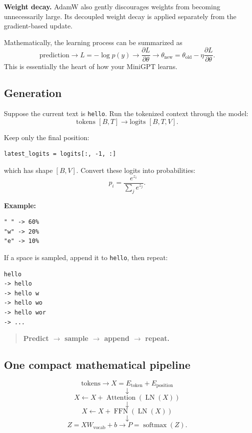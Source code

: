 \textbf{Weight decay.} AdamW also gently discourages weights from becoming
unnecessarily large. Its decoupled weight decay is applied separately from
the gradient-based update.

Mathematically, the learning process can be summarized as
\[
  \text{prediction}
  \longrightarrow
  L=-\log p(y)
  \longrightarrow
  \frac{\partial L}{\partial\theta}
  \longrightarrow
  \theta_{\text{new}}
  =\theta_{\text{old}}
  -\eta\frac{\partial L}{\partial\theta}.
\]
This is essentially the heart of how your MiniGPT learns.



\subsection{Generation}

Suppose the current text is \texttt{hello}. Run the tokenized context through
the model:
\[
  \text{tokens }[B,T]
  \longrightarrow
  \text{logits }[B,T,V].
\]

Keep only the final position:
\begin{verbatim}
latest_logits = logits[:, -1, :]
\end{verbatim}
which has shape \([B,V]\). Convert these logits into probabilities:
\[
  p_i=\frac{e^{z_i}}{\sum_j e^{z_j}}.
\]

\textbf{Example:}
\begin{verbatim}
" " -> 60%
"w" -> 20%
"e" -> 10%
\end{verbatim}

If a space is sampled, append it to \texttt{hello}, then repeat:
\begin{verbatim}
hello
-> hello 
-> hello w
-> hello wo
-> hello wor
-> ...
\end{verbatim}

\begin{quote}
  \textbf{Predict \(\rightarrow\) sample \(\rightarrow\) append
  \(\rightarrow\) repeat.}
\end{quote}

\subsection*{One compact mathematical pipeline}

\[
  \text{tokens}
  \longrightarrow
  X=E_{\text{token}}+E_{\text{position}}
\]
\[
  \downarrow
\]
\[
  X\leftarrow X+
  \operatorname{Attention}\!\left(\operatorname{LN}(X)\right)
\]
\[
  \downarrow
\]
\[
  X\leftarrow X+
  \operatorname{FFN}\!\left(\operatorname{LN}(X)\right)
\]
\[
  \downarrow
\]
\[
  Z=XW_{\text{vocab}}+b
  \longrightarrow
  P=\operatorname{softmax}(Z).
\]

